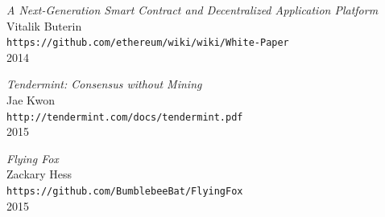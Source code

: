 \documentclass[a4paper]{article}
\begin{document}
\begin{thebibliography}{99}
  \emph{A Next-Generation Smart Contract and Decentralized Application Platform}\\
  Vitalik Buterin\\
  \texttt{https://github.com/ethereum/wiki/wiki/White-Paper}\\
  2014

  \emph{Tendermint: Consensus without Mining}\\
  Jae Kwon\\
  \texttt{http://tendermint.com/docs/tendermint.pdf}\\
  2015

  \emph{Flying Fox}\\
  Zackary Hess\\
  \texttt{https://github.com/BumblebeeBat/FlyingFox}\\
  2015

\end{thebibliography}
\end{document}
